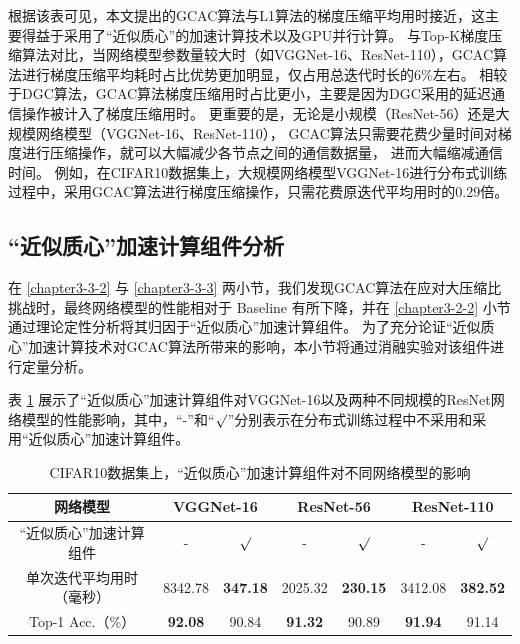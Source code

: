 \documentclass{xdupgthesis}
\begin{document}
根据该表可见，本文提出的GCAC算法与L1算法的梯度压缩平均用时接近，这主要得益于采用了“近似质心”的加速计算技术以及GPU并行计算。
与Top-K梯度压缩算法对比，当网络模型参数量较大时（如VGGNet-16、ResNet-110），GCAC算法进行梯度压缩平均耗时占比优势更加明显，仅占用总迭代时长的$6\%$左右。
相较于DGC算法，GCAC算法梯度压缩用时占比更小，主要是因为DGC采用的延迟通信操作被计入了梯度压缩用时。
更重要的是，无论是小规模（ResNet-56）还是大规模网络模型（VGGNet-16、ResNet-110），
GCAC算法只需要花费少量时间对梯度进行压缩操作，就可以大幅减少各节点之间的通信数据量，
进而大幅缩减通信时间。
例如，在CIFAR10数据集上，大规模网络模型VGGNet-16进行分布式训练过程中，采用GCAC算法进行梯度压缩操作，只需花费原迭代平均用时的0.29倍。

\subsection{“近似质心”加速计算组件分析}

在 \ref{chapter3-3-2} 与 \ref{chapter3-3-3} 两小节，我们发现GCAC算法在应对大压缩比挑战时，最终网络模型的性能相对于 Baseline 有所下降，并在 \ref{chapter3-2-2} 小节通过理论定性分析将其归因于“近似质心”加速计算组件。
为了充分论证“近似质心”加速计算技术对GCAC算法所带来的影响，本小节将通过消融实验对该组件进行定量分析。

表 \ref{tab_Result-gcac-Centroid-contrast} 展示了“近似质心”加速计算组件对VGGNet-16以及两种不同规模的ResNet网络模型的性能影响，其中，“-”和“$\surd$”分别表示在分布式训练过程中不采用和采用“近似质心”加速计算组件。

\renewcommand{\arraystretch}{1.3}
\begin{table}[ht]
    \centering
    \begin{threeparttable}
        \caption{CIFAR10数据集上，“近似质心”加速计算组件对不同网络模型的影响}
        \label{tab_Result-gcac-Centroid-contrast}
        \begin{tabular}{c|c|c|c|c|c|c}
            \toprule
            \toprule
            网络模型 & \multicolumn{2}{c|}{VGGNet-16} & \multicolumn{2}{c|}{ResNet-56} & \multicolumn{2}{c}{ResNet-110} \\
            \midrule
            “近似质心”加速计算组件 & - & $\surd$ &  - & $\surd$ & - & $\surd$ \\
            \midrule
            单次迭代平均用时（毫秒） & 8342.78 & \textbf{347.18}  & 2025.32 & \textbf{230.15} & 3412.08 & \textbf{382.52} \\
            \midrule
            Top-1 Acc.（$\%$） & \textbf{92.08} & 90.84 & \textbf{91.32} & 90.89 & \textbf{91.94} & 91.14 \\
            \bottomrule
            \bottomrule
        \end{tabular}
    \end{threeparttable}
\end{table}
\end{document}
